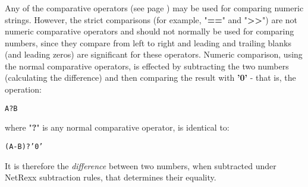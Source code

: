 \subsubsection{}\label{"id"}
 Any of the  comparative operators (see page \pageref{refcomps})  may be used
for comparing numeric strings.
However, the strict comparisons (for example, "\textbf{==}" and
"\textbf{>>}") are not numeric comparative operators and should
not normally be used for comparing numbers, since they compare from left
to right and leading and trailing blanks (and leading zeros) are
significant for these operators.
 Numeric comparison, using the normal comparative operators, is
effected by subtracting the two numbers (calculating the difference) and
then comparing the result with \textbf{'0'} - that is, the
operation:
\begin{alltt}
A ? B
\end{alltt}
where "\textbf{?}" is any normal comparative operator, is
identical to:
\begin{alltt}
(A - B) ? '0'
\end{alltt}
It is therefore the \emph{difference} between two numbers, when
subtracted under NetRexx subtraction rules, that determines their equality.

